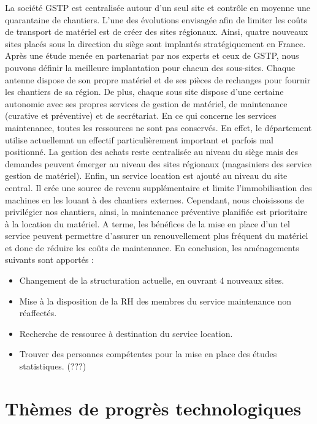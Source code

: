 La société GSTP est centralisée autour d’un seul site et contrôle en moyenne une quarantaine de chantiers. 
L’une des évolutions envisagée afin de limiter les coûts de transport de matériel est de créer des sites régionaux.
Ainsi, quatre nouveaux sites placés sous la direction du siège sont implantés stratégiquement en France. 
Après une étude menée en partenariat par nos experts et ceux de GSTP, nous pouvons définir la meilleure implantation pour chacun des sous-sites. 
Chaque antenne dispose de son propre matériel et de ses pièces de rechanges pour fournir les chantiers de sa région.
De plus, chaque sous site dispose d’une certaine autonomie avec ses propres services de gestion de matériel, de maintenance (curative et préventive) et de secrétariat. 
En ce qui concerne les services maintenance, toutes les ressources ne sont pas conservés. En effet, le département
utilise actuellemnt un effectif particulièrement important et parfois mal positionné. 
La gestion des achats reste centralisée au niveau du siège mais des demandes peuvent émerger au niveau des sites régionaux (magasiniers des service gestion de matériel).
Enfin, un service location est ajouté au niveau du site central. Il crée une source de revenu supplémentaire et limite l’immobilisation des machines en les louant à des chantiers externes. Cependant, nous choisissons de privilégier nos chantiers, ainsi, la maintenance préventive planifiée est prioritaire à la location du matériel. A terme, les bénéfices de la mise en place d’un tel service peuvent permettre d’assurer un renouvellement plus fréquent du matériel et donc de réduire les coûts de maintenance.
En conclusion, les aménagements suivants sont apportés :
        \begin{itemize}
                \item Changement de la structuration actuelle, en ouvrant 4 nouveaux sites.
                \item Mise à la disposition de la RH des membres du service maintenance non réaffectés.
                \item Recherche de ressource à destination du service location.
                \item Trouver des personnes compétentes pour la mise en place des études statistiques. (???)
        \end{itemize} 

		

\section{Thèmes de progrès technologiques}

